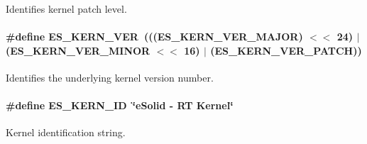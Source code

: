 Identifies kernel patch level. 

\hypertarget{group__kern__id_gacde22f7336a3c1c032dfc0ee3b94f506}{
\paragraph[{E\-S\-\_\-\-K\-E\-R\-N\-\_\-\-V\-E\-R}]{\setlength{\rightskip}{0pt plus 5cm}\#define E\-S\-\_\-\-K\-E\-R\-N\-\_\-\-V\-E\-R~((({\bf E\-S\-\_\-\-K\-E\-R\-N\-\_\-\-V\-E\-R\-\_\-\-M\-A\-J\-O\-R}) $<$$<$ 24) $|$ ({\bf E\-S\-\_\-\-K\-E\-R\-N\-\_\-\-V\-E\-R\-\_\-\-M\-I\-N\-O\-R} $<$$<$ 16) $|$ ({\bf E\-S\-\_\-\-K\-E\-R\-N\-\_\-\-V\-E\-R\-\_\-\-P\-A\-T\-C\-H}))}}\label{group__kern__id_gacde22f7336a3c1c032dfc0ee3b94f506}


Identifies the underlying kernel version number. 

\hypertarget{group__kern__id_ga7a9484c6b09349e4eb82ba67c0989e25}{
\paragraph[{E\-S\-\_\-\-K\-E\-R\-N\-\_\-\-I\-D}]{\setlength{\rightskip}{0pt plus 5cm}\#define E\-S\-\_\-\-K\-E\-R\-N\-\_\-\-I\-D~\char`\"{}e\-Solid -\/ R\-T Kernel\char`\"{}}}\label{group__kern__id_ga7a9484c6b09349e4eb82ba67c0989e25}


Kernel identification string. 

